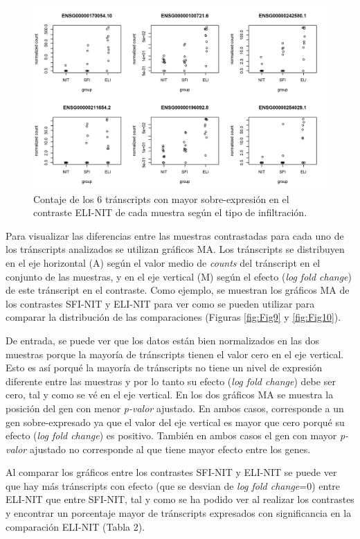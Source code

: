 \documentclass[
]{article}
\begin{document}
\begin{figure}

{\centering \includegraphics[width=0.8\linewidth]{results/4.DEAnl/2.CntsEvN} 

}

\caption{Contaje de los 6 tránscripts con mayor sobre-expresión en el contraste ELI-NIT de cada muestra según el tipo de infiltración.}\label{fig:Fig8}
\end{figure}

Para visualizar las diferencias entre las muestras contrastadas para
cada uno de los tránscripts analizados se utilizan gráficos MA. Los
tránscripts se distribuyen en el eje horizontal (A) según el valor medio
de \emph{counts} del tránscript en el conjunto de las muestras, y en el
eje vertical (M) según el efecto (\emph{log fold change}) de este
tránscript en el contraste. Como ejemplo, se muestran los gráficos MA de
los contrastes SFI-NIT y ELI-NIT para ver como se pueden utilizar para
comparar la distribución de las comparaciones (Figuras \ref{fig:Fig9} y
\ref{fig:Fig10}).

De entrada, se puede ver que los datos están bien normalizados en las
dos muestras porque la mayoría de tránscripts tienen el valor cero en el
eje vertical. Esto es así porqué la mayoría de tránscripts no tiene un
nivel de expresión diferente entre las muestras y por lo tanto su efecto
(\emph{log fold change}) debe ser cero, tal y como se vé en el eje
vertical. En los dos gráficos MA se muestra la posición del gen con
menor \emph{p-valor} ajustado. En ambos casos, corresponde a un gen
sobre-expresado ya que el valor del eje vertical es mayor que cero
porqué su efecto (\emph{log fold change}) es positivo. También en ambos
casos el gen con mayor \emph{p-valor} ajustado no corresponde al que
tiene mayor efecto entre los genes.

Al comparar los gráficos entre los contrastes SFI-NIT y ELI-NIT se puede
ver que hay más tránscripts con efecto (que se desvian de \emph{log fold
change}=0) entre ELI-NIT que entre SFI-NIT, tal y como se ha podido ver
al realizar los contrastes y encontrar un porcentaje mayor de
tránscripts expresados con significancia en la comparación ELI-NIT
(Tabla 2).
\end{document}
